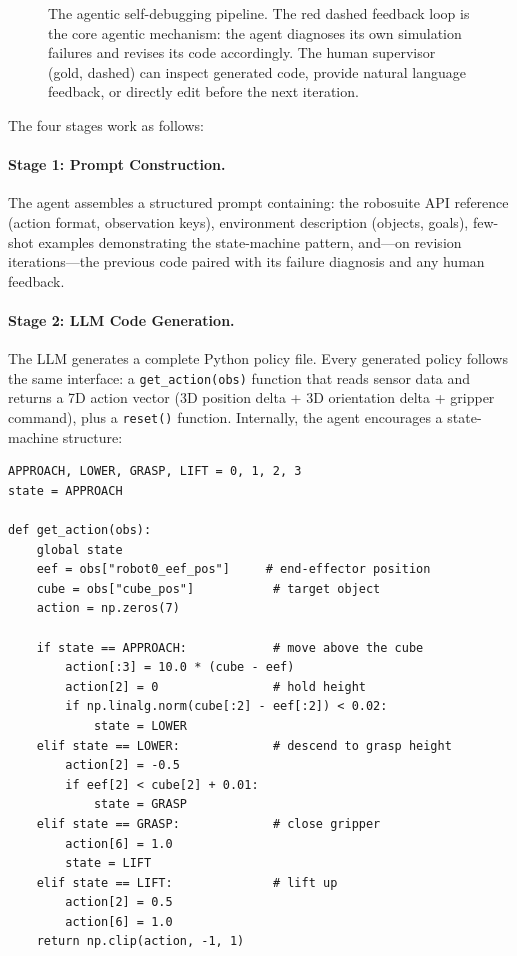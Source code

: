 \documentclass[11pt]{article}
\begin{document}
\begin{figure}[t]
\caption{The agentic self-debugging pipeline. The red dashed feedback loop is the core agentic mechanism: the agent diagnoses its own simulation failures and revises its code accordingly. The human supervisor (gold, dashed) can inspect generated code, provide natural language feedback, or directly edit before the next iteration.}
\label{fig:pipeline}
\end{figure}

The four stages work as follows:

\paragraph{Stage 1: Prompt Construction.}
The agent assembles a structured prompt containing: the robosuite API reference (action format, observation keys), environment description (objects, goals), few-shot examples demonstrating the state-machine pattern, and---on revision iterations---the previous code paired with its failure diagnosis and any human feedback.

\paragraph{Stage 2: LLM Code Generation.}
The LLM generates a complete Python policy file. Every generated policy follows the same interface: a \texttt{get\_action(obs)} function that reads sensor data and returns a 7D action vector (3D position delta + 3D orientation delta + gripper command), plus a \texttt{reset()} function. Internally, the agent encourages a state-machine structure:

\begin{lstlisting}[style=policy, caption={Example generated policy structure (Lift task).}]
APPROACH, LOWER, GRASP, LIFT = 0, 1, 2, 3
state = APPROACH

def get_action(obs):
    global state
    eef = obs["robot0_eef_pos"]     # end-effector position
    cube = obs["cube_pos"]           # target object
    action = np.zeros(7)

    if state == APPROACH:            # move above the cube
        action[:3] = 10.0 * (cube - eef)
        action[2] = 0                # hold height
        if np.linalg.norm(cube[:2] - eef[:2]) < 0.02:
            state = LOWER
    elif state == LOWER:             # descend to grasp height
        action[2] = -0.5
        if eef[2] < cube[2] + 0.01:
            state = GRASP
    elif state == GRASP:             # close gripper
        action[6] = 1.0
        state = LIFT
    elif state == LIFT:              # lift up
        action[2] = 0.5
        action[6] = 1.0
    return np.clip(action, -1, 1)
\end{lstlisting}
\end{document}
